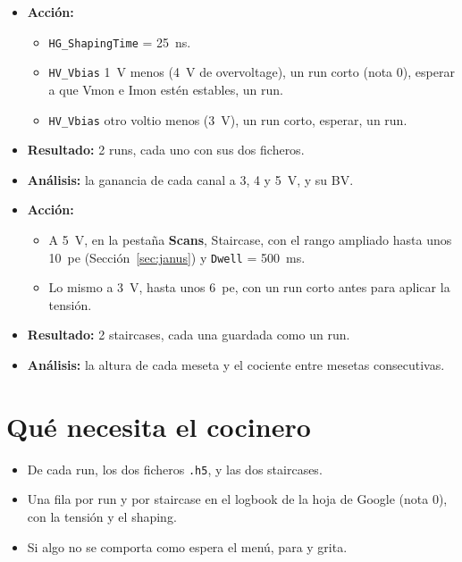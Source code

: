 \documentclass[11pt,a4paper]{article}
\begin{document}
\begin{itemize}
\item {\bf Acción:}
  \begin{itemize}
  \item \texttt{HG\_ShapingTime} = 25~ns.
  \item \texttt{HV\_Vbias} 1~V menos (4~V de overvoltage), un run corto
    (nota 0), esperar a que Vmon e Imon estén estables, un run.
  \item \texttt{HV\_Vbias} otro voltio menos (3~V), un run corto, esperar,
    un run.
  \end{itemize}
\item {\bf Resultado:} 2 runs, cada uno con sus dos ficheros.
\item {\bf Análisis:} la ganancia de cada canal a 3, 4 y 5~V, y su BV.
\end{itemize}

\begin{itemize}
\item {\bf Acción:}
  \begin{itemize}
  \item A 5~V, en la pestaña {\bf Scans}, Staircase, con el rango ampliado
    hasta unos 10~pe (Sección~\ref{sec:janus}) y \texttt{Dwell} = 500~ms.
  \item Lo mismo a 3~V, hasta unos 6~pe, con un run corto antes para
    aplicar la tensión.
  \end{itemize}
\item {\bf Resultado:} 2 staircases, cada una guardada como un run.
\item {\bf Análisis:} la altura de cada meseta y el cociente entre mesetas
  consecutivas.
\end{itemize}

\section*{Qué necesita el cocinero}

\begin{itemize}
\item De cada run, los dos ficheros \texttt{.h5}, y las dos staircases.
\item Una fila por run y por staircase en el logbook de la hoja de Google
  (nota 0), con la tensión y el shaping.
\item Si algo no se comporta como espera el menú, para y grita.
\end{itemize}
\end{document}
